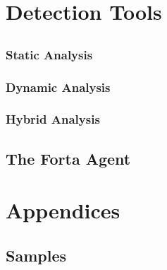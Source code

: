 \documentclass[11pt,fleqn,oneside]{book} %
\begin{document}
\part{Detection Tools}
\chapter{} \label{ch:}
\section{Static Analysis} \label{sec:static-analysis}
\section{Dynamic Analysis} \label{sec:dynamic-analysis}
\section{Hybrid Analysis} \label{sec:hybrid-analysis}
\chapter{The Forta Agent} \label{ch:forta-agent}

\renewcommand{\thechapter}{\Alph{chapter}}
\renewcommand{\thesection}{\Alph{chapter}.\Roman{section}}
\renewcommand{\thesubsection}{\Alph{chapter}.\Roman{section}.\alph{subsection}}
\part{Appendices}
\chapter{Samples}

\newpage\printbibliography[title = {Resources}]
\end{document}
